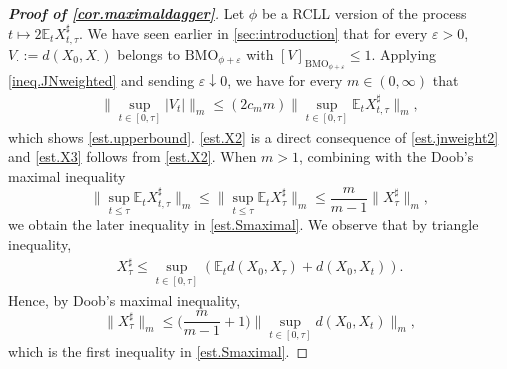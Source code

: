 \documentclass[12pt,oneside,reqno,fleqn]{amsart}
\numberwithin{equation}{section}
\newtheorem{lemma}[theorem]{Lemma}
\theoremstyle{remark}
\newcommand\cff{{\mathcal F}}
\newcommand\mE{{\mathbb E}}
\newcommand\E{\mE}
\newcommand{\tand}{\quad\text{and}\quad}
\newcommand{\1}{{\mathbf 1}}
\renewcommand{\le}{\leq}
\newcommand{\bmo}{{\mathrm{BMO}}}
\begin{document}
		
	
	\begin{proof}[\bf Proof of \cref{cor.maximaldagger}]
		Let $\phi$ be a RCLL version of  the process $t\mapsto 2\E_tX^\sharp_{t,\tau}$. We have seen earlier in \cref{sec:introduction} that for every $\varepsilon>0$, $V_{\cdot}:=d(X_0,X_{\cdot})$ belongs to $\bmo_{\phi+\varepsilon}$ with $[V]_{\bmo_{\phi+\varepsilon}}\le 1$. 
		Applying \eqref{ineq.JNweighted} and sending $\varepsilon\downarrow0$, we have for every $m\in(0,\infty)$ that
		\begin{align*}
		 	\|\sup_{t\in[0,\tau]}|V_t|\|_m\le (2c_mm)\|\sup_{t\in[0,\tau]}\E_tX^\sharp_{t,\tau}\|_m,
		\end{align*}
		which shows \eqref{est.upperbound}.
		\eqref{est.X2} is a direct consequence of \eqref{est.jnweight2} and \eqref{est.X3} follows from \eqref{est.X2}.
		When $m>1$, combining with the Doob's maximal inequality 
		\[
			\|\sup_{t\le \tau}\E_tX^\sharp_{t,\tau}\|_m\le \|\sup_{t\le \tau}\E_tX^\sharp_\tau\|_m\le \frac m{m-1}\|X^\sharp_\tau\|_m,
		\] we obtain the later inequality in \eqref{est.Smaximal}.  We observe that  by triangle inequality,
		\begin{align*}
			X^\sharp_\tau\le\sup_{t\in[0,\tau]}(\E_td(X_0,X_\tau)+d(X_0,X_t)).
		\end{align*}
		Hence, by Doob's maximal inequality,
		\[
			\|X^\sharp_\tau\|_m\le \Big(\frac{m}{m-1}+1\Big)\Big\|\sup_{t\in[0,\tau]}d(X_0,X_t)\Big\|_m,
		\]
		which is the first inequality in \eqref{est.Smaximal}.


\end{proof}
\end{document}
